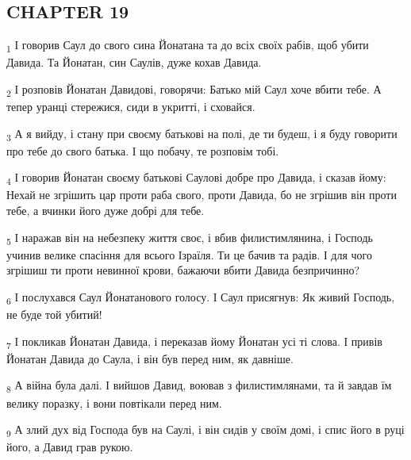 \subsection{CHAPTER 19}
\begin{tcolorbox}
\textsubscript{1} І говорив Саул до свого сина Йонатана та до всіх своїх рабів, щоб убити Давида. Та Йонатан, син Саулів, дуже кохав Давида.
\end{tcolorbox}
\begin{tcolorbox}
\textsubscript{2} І розповів Йонатан Давидові, говорячи: Батько мій Саул хоче вбити тебе. А тепер уранці стережися, сиди в укритті, і сховайся.
\end{tcolorbox}
\begin{tcolorbox}
\textsubscript{3} А я вийду, і стану при своєму батькові на полі, де ти будеш, і я буду говорити про тебе до свого батька. І що побачу, те розповім тобі.
\end{tcolorbox}
\begin{tcolorbox}
\textsubscript{4} І говорив Йонатан своєму батькові Саулові добре про Давида, і сказав йому: Нехай не згрішить цар проти раба свого, проти Давида, бо не згрішив він проти тебе, а вчинки його дуже добрі для тебе.
\end{tcolorbox}
\begin{tcolorbox}
\textsubscript{5} І наражав він на небезпеку життя своє, і вбив филистимлянина, і Господь учинив велике спасіння для всього Ізраїля. Ти це бачив та радів. І для чого згрішиш ти проти невинної крови, бажаючи вбити Давида безпричинно?
\end{tcolorbox}
\begin{tcolorbox}
\textsubscript{6} І послухався Саул Йонатанового голосу. І Саул присягнув: Як живий Господь, не буде той убитий!
\end{tcolorbox}
\begin{tcolorbox}
\textsubscript{7} І покликав Йонатан Давида, і переказав йому Йонатан усі ті слова. І привів Йонатан Давида до Саула, і він був перед ним, як давніше.
\end{tcolorbox}
\begin{tcolorbox}
\textsubscript{8} А війна була далі. І вийшов Давид, воював з филистимлянами, та й завдав їм велику поразку, і вони повтікали перед ним.
\end{tcolorbox}
\begin{tcolorbox}
\textsubscript{9} А злий дух від Господа був на Саулі, і він сидів у своїм домі, і спис його в руці його, а Давид грав рукою.
\end{tcolorbox}
